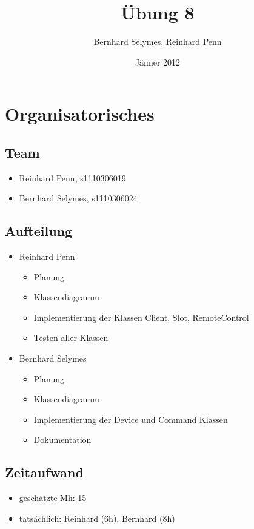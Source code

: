 \documentclass[12pt,a4paper]{article}
\begin{document}
\title{Übung 8}
\author{Bernhard Selymes, Reinhard Penn}
\date{Jänner 2012}

\normalsize

\newcommand{\CodePath}{../RemoteControl/RemoteControl/}

\section{Organisatorisches}

\subsection{Team}
	\begin {itemize} 
		\item Reinhard Penn, s1110306019 
		\item Bernhard Selymes, s1110306024
	\end {itemize}

\subsection{Aufteilung}
	\begin {itemize} 
		\item Reinhard Penn
			\begin {itemize}
				\item Planung
				\item Klassendiagramm
				\item Implementierung der Klassen Client, Slot, RemoteControl
				\item Testen aller Klassen
			\end {itemize}
		\item Bernhard Selymes
			\begin {itemize}
				\item Planung
				\item Klassendiagramm
				\item Implementierung der Device und Command Klassen
				\item Dokumentation		
			\end {itemize}
	\end {itemize}


\subsection{Zeitaufwand}
	\begin {itemize}
		\item geschätzte Mh: 15
		\item tatsächlich: Reinhard (6h), Bernhard  (8h)
	\end {itemize}
\end{document}
